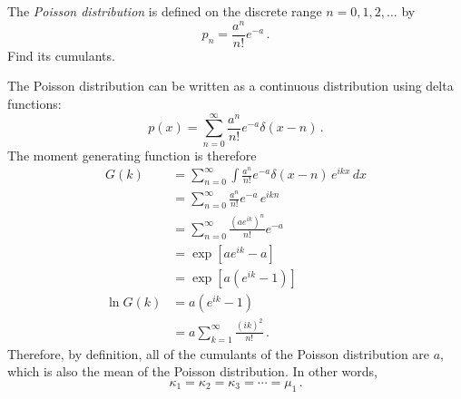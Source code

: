 

The \emph{Poisson distribution} is defined on the discrete range $n=0, 1, 2,\ldots$ by
\begin{equation*}
  p_n = \frac{a^n}{n!}e^{-a} \, .
\end{equation*}
Find its cumulants.


The Poisson distribution can be written as a continuous distribution using delta functions:
\begin{equation*}
  p(x) = \sum_{n=0}^\infty \frac{a^n}{n!}e^{-a} \delta(x - n) \, .
\end{equation*}
The moment generating function is therefore
\begin{align*}
  G(k)
  &= \sum_{n=0}^\infty \int \frac{a^n}{n!}e^{-a} \delta(x - n) \, e^{i k x} \, dx \\
  &= \sum_{n=0}^\infty \frac{a^n}{n!}e^{-a} \, e^{i k n} \\
  &= \sum_{n=0}^\infty \frac{(ae^{ik})^n}{n!} e^{-a} \\
  &= \exp \left[ a e^{ik} - a \right] \\
  &= \exp \left[ a (e^{ik} - 1) \right] \\
  \ln G(k)
  &= a (e^{ik} - 1) \\
  &= a \sum_{k=1}^\infty \frac{(ik)^2}{n!}
  \, .
\end{align*}
Therefore, by definition, all of the cumulants of the Poisson distribution are $a$, which is also the mean of the Poisson distribution.
In other words,
\begin{equation*}
  \kappa_1 = \kappa_2 = \kappa_3 = \cdots = \mu_1
  \, .
\end{equation*}
